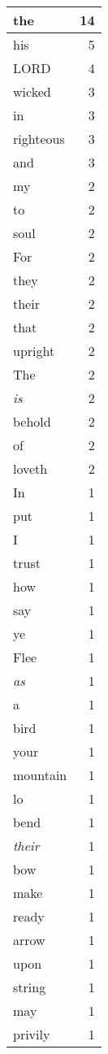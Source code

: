 \begin{center}
\begin{longtable}{l|r}
\hline \hline
\endlastfoot
the & 14 \\ \hline
his & 5 \\ \hline
LORD & 4 \\ \hline
wicked & 3 \\ \hline
in & 3 \\ \hline
righteous & 3 \\ \hline
and & 3 \\ \hline
my & 2 \\ \hline
to & 2 \\ \hline
soul & 2 \\ \hline
For & 2 \\ \hline
they & 2 \\ \hline
their & 2 \\ \hline
that & 2 \\ \hline
upright & 2 \\ \hline
The & 2 \\ \hline
\emph{is} & 2 \\ \hline
behold & 2 \\ \hline
of & 2 \\ \hline
loveth & 2 \\ \hline
In & 1 \\ \hline
put & 1 \\ \hline
I & 1 \\ \hline
trust & 1 \\ \hline
how & 1 \\ \hline
say & 1 \\ \hline
ye & 1 \\ \hline
Flee & 1 \\ \hline
\emph{as} & 1 \\ \hline
a & 1 \\ \hline
bird & 1 \\ \hline
your & 1 \\ \hline
mountain & 1 \\ \hline
lo & 1 \\ \hline
bend & 1 \\ \hline
\emph{their} & 1 \\ \hline
bow & 1 \\ \hline
make & 1 \\ \hline
ready & 1 \\ \hline
arrow & 1 \\ \hline
upon & 1 \\ \hline
string & 1 \\ \hline
may & 1 \\ \hline
privily & 1 \\ \hline

\end{longtable}
\end{center}
